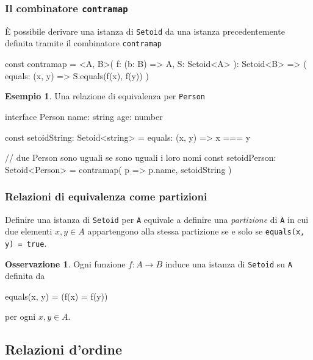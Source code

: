 \documentclass[12pt]{article}
\theoremstyle{definition}
\newtheorem{example}{Esempio}[section]
\newtheorem{observation}{Osservazione}[section]
\newenvironment{code}
  {\vspace{0.5cm} \VerbatimEnvironment\begin{typescriptcode}}
  {\end{typescriptcode} \vspace{0.2cm}}
\begin{document}
\subsubsection{Il combinatore \texttt{contramap}}

È possibile derivare una istanza di \texttt{Setoid} da una istanza precedentemente definita tramite il combinatore \texttt{contramap}

\begin{code}
const contramap = <A, B>(
  f: (b: B) => A,
  S: Setoid<A>
): Setoid<B> => ({
  equals: (x, y) => S.equals(f(x), f(y))
})
\end{code}

\begin{example}
Una relazione di equivalenza per \texttt{Person}

\begin{code}
interface Person {
  name: string
  age: number
}

const setoidString: Setoid<string> = {
  equals: (x, y) => x === y
}

// due Person sono uguali se sono uguali i loro nomi
const setoidPerson: Setoid<Person> = contramap(
  p => p.name,
  setoidString
)
\end{code}
\end{example}

\subsubsection{Relazioni di equivalenza come partizioni}

Definire una istanza di \texttt{Setoid} per \texttt{A} equivale a definire una \emph{partizione} di \texttt{A} in cui due
elementi $x, y \in A$ appartengono alla stessa partizione se e solo se \texttt{equals(x, y) = true}.

\begin{observation}
Ogni funzione $f: A \rightarrow B$ induce una istanza di \texttt{Setoid} su \texttt{A} definita da

\begin{code}
equals(x, y) = (f(x) = f(y))
\end{code}
\end{observation}

per ogni $x, y \in A$.

\subsection{Relazioni d'ordine}
\end{document}
